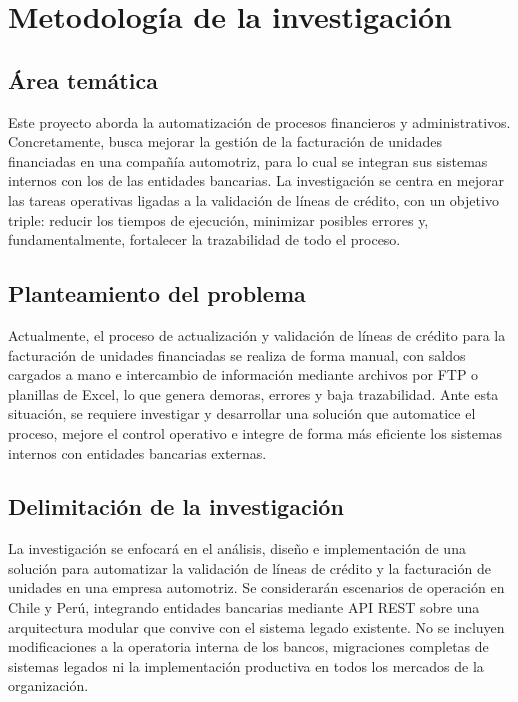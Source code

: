 \chapter{Metodología de la investigación}\label{cap:metodologia}

\section{Área temática}

Este proyecto aborda la automatización de procesos financieros y administrativos. Concretamente, busca mejorar la gestión de la facturación de unidades financiadas en una compañía automotriz, para lo cual se integran sus sistemas internos con los de las entidades bancarias. La investigación se centra en mejorar las tareas operativas ligadas a la validación de líneas de crédito, con un objetivo triple: reducir los tiempos de ejecución, minimizar posibles errores y, fundamentalmente, fortalecer la trazabilidad de todo el proceso.

\section{Planteamiento del problema}

Actualmente, el proceso de actualización y validación de líneas de crédito para la facturación de unidades financiadas se realiza de forma manual, con saldos cargados a mano e intercambio de información mediante archivos por FTP o planillas de Excel, lo que genera demoras, errores y baja trazabilidad. Ante esta situación, se requiere investigar y desarrollar una solución que automatice el proceso, mejore el control operativo e integre de forma más eficiente los sistemas internos con entidades bancarias externas.

\section{Delimitación de la investigación}

La investigación se enfocará en el análisis, diseño e implementación de una solución para automatizar la validación de líneas de crédito y la facturación de unidades en una empresa automotriz. Se considerarán escenarios de operación en Chile y Perú, integrando entidades bancarias mediante API REST sobre una arquitectura modular que convive con el sistema legado existente. No se incluyen modificaciones a la operatoria interna de los bancos, migraciones completas de sistemas legados ni la implementación productiva en todos los mercados de la organización.

